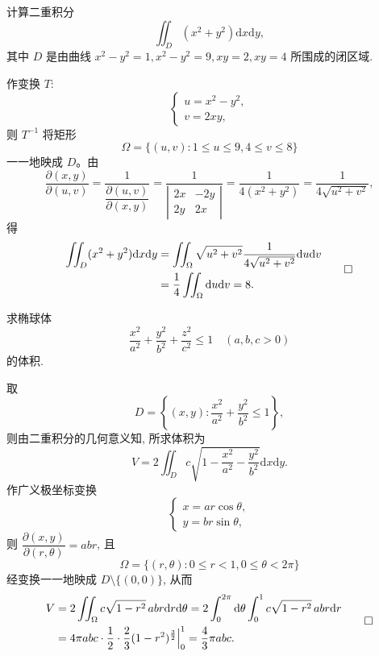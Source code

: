 \begin{example}\label{example:ma-15-4-3}
计算二重积分
\[
  \iint_D(x^2+y^2)\mathrm dx\mathrm dy,
\]
其中 $D$ 是由曲线 $x^2-y^2=1,x^2-y^2=9,xy=2,xy=4$ 所围成的闭区域.
\end{example}


\begin{solve}
作变换 $T$:
\[
  \begin{cases}
    u=x^2-y^2,\\
    v=2xy,
  \end{cases}
\]
则 $T^{-1}$ 将矩形
\[
  \Omega=\{(u,v):1\leqslant u\leqslant9,4\leqslant v\leqslant8\}
  \]
一一地映成 $D$。由
\[
  \frac{\partial(x,y)}{\partial(u,v)}
  =\frac1{\dfrac{\partial(u,v)}{\partial(x,y)}}
  =\frac1{\left|\begin{matrix}2x&-2y\\2y&2x\end{matrix}\right|}
  =\frac1{4(x^2+y^2)}
  =\frac1{4\sqrt{u^2+v^2}},
\]
得
\[
\begin{aligned}
  \iint_D(x^2+y^2)\mathrm dx\mathrm dy
  &=\iint_\Omega\sqrt{u^2+v^2}\frac1{4\sqrt{u^2+v^2}}\mathrm du\mathrm dv\\
  &=\frac14\iint_\Omega\mathrm du\mathrm dv=8.
\end{aligned}
\qedhere
\]
\end{solve}


\begin{example}\label{example:ma-15-4-4}
求椭球体
\[
  \frac{x^2}{a^2}+\frac{y^2}{b^2}+\frac{z^2}{c^2}\leqslant1\quad(a,b,c>0)
\]
的体积.
\end{example}


\begin{solve}
取
\[
  D=\left\{(x,y):\frac{x^2}{a^2}+\frac{y^2}{b^2}\leqslant1\right\},
\]
则由二重积分的几何意义知, 所求体积为
\[
  V=2\iint_D c\sqrt{1-\frac{x^2}{a^2}-\frac{y^2}{b^2}}\mathrm dx\mathrm dy.
\]
作广义极坐标变换
\[
  \begin{cases}
    x=ar\cos\theta,\\
    y=br\sin\theta,
  \end{cases}
\]
则 $\dfrac{\partial(x,y)}{\partial(r,\theta)}=abr$, 且
\[
  \Omega=\{(r,\theta):0\leqslant r<1,0\leqslant\theta<2\pi\}
\]
经变换一一地映成 $D\setminus\{(0,0)\}$, 从而
\[
\begin{aligned}
  V&=2\iint_\Omega c\sqrt{1-r^2}\,abr\mathrm dr\mathrm d\theta
  =2\int_0^{2\pi}\mathrm d\theta\int_0^1 c\sqrt{1-r^2}\,abr\mathrm dr\\
  &=4\pi abc\cdot\frac12\cdot\frac23(1-r^2)^{\frac32}\Big|_0^1
  =\frac43\pi abc.
\end{aligned}
\qedhere
\]
\end{solve}


